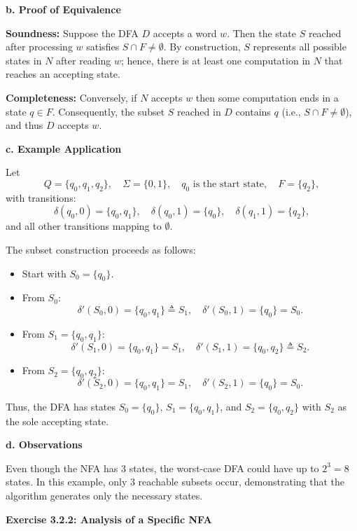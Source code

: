 \documentclass{article}
\theoremstyle{theorem}
\theoremstyle{definition}
\theoremstyle{remark}
\begin{document}
\textbf{b. Proof of Equivalence}

\textbf{Soundness:} Suppose the DFA \(D\) accepts a word \(w\). Then the state \(S\) reached after processing \(w\) satisfies \(S\cap F\neq \emptyset\). By construction, \(S\) represents all possible states in \(N\) after reading \(w\); hence, there is at least one computation in \(N\) that reaches an accepting state.

\textbf{Completeness:} Conversely, if \(N\) accepts \(w\) then some computation ends in a state \(q\in F\). Consequently, the subset \(S\) reached in \(D\) contains \(q\) (i.e., \(S\cap F\neq \emptyset\)), and thus \(D\) accepts \(w\).

\textbf{c. Example Application}

Let 
\[
Q=\{q_0,q_1,q_2\}, \quad \Sigma=\{0,1\}, \quad q_0 \text{ is the start state}, \quad F=\{q_2\},
\]
with transitions:
\[
\delta(q_0,0)=\{q_0,q_1\},\quad \delta(q_0,1)=\{q_0\},\quad \delta(q_1,1)=\{q_2\},
\]
and all other transitions mapping to \(\emptyset\).

The subset construction proceeds as follows:
\begin{itemize}
    \item Start with \(S_0=\{q_0\}\).
    \item From \(S_0\):
    \[
      \delta'(S_0,0)=\{q_0,q_1\}\triangleq S_1,\quad \delta'(S_0,1)=\{q_0\}=S_0.
    \]
    \item From \(S_1=\{q_0,q_1\}\):
    \[
      \delta'(S_1,0)=\{q_0,q_1\}=S_1,\quad \delta'(S_1,1)=\{q_0,q_2\}\triangleq S_2.
    \]
    \item From \(S_2=\{q_0,q_2\}\):
    \[
      \delta'(S_2,0)=\{q_0,q_1\}=S_1,\quad \delta'(S_2,1)=\{q_0\}=S_0.
    \]
\end{itemize}
Thus, the DFA has states \(S_0=\{q_0\}\), \(S_1=\{q_0,q_1\}\), and \(S_2=\{q_0,q_2\}\) with \(S_2\) as the sole accepting state.

\textbf{d. Observations}

Even though the NFA has 3 states, the worst-case DFA could have up to \(2^3=8\) states. In this example, only 3 reachable subsets occur, demonstrating that the algorithm generates only the necessary states.

\textbf{Exercise 3.2.2: Analysis of a Specific NFA}
\end{document}
